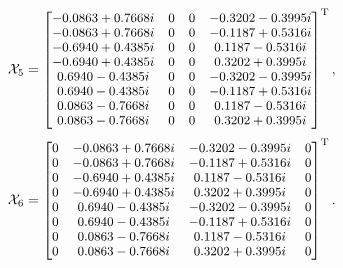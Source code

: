 \documentclass[journal]{IEEEtran}
\begin{document}
 \begin{equation}
  \footnotesize   
     \mathcal X_5=
\begin{bmatrix}
    -0.0863 + 0.7668i    &     0    &     0    &    -0.3202 - 0.3995i\\
  -0.0863 + 0.7668i    &     0    &     0    &    -0.1187 + 0.5316i\\
  -0.6940 + 0.4385i    &     0    &     0    &     0.1187 - 0.5316i\\
  -0.6940 + 0.4385i    &     0    &     0    &     0.3202 + 0.3995i\\
   0.6940 - 0.4385i    &     0    &     0    &    -0.3202 - 0.3995i\\
   0.6940 - 0.4385i    &     0    &     0    &    -0.1187 + 0.5316i\\
   0.0863 - 0.7668i    &     0    &     0    &     0.1187 - 0.5316i\\
   0.0863 - 0.7668i    &     0    &     0    &     0.3202 + 0.3995i\\
      \end{bmatrix}^{\text{T}}, \notag
  \end{equation}
\begin{equation}
  \footnotesize   
     \mathcal X_6=
\begin{bmatrix}
   0    &    -0.0863 + 0.7668i    &    -0.3202 - 0.3995i    &     0\\
   0    &    -0.0863 + 0.7668i    &    -0.1187 + 0.5316i    &     0\\
   0    &    -0.6940 + 0.4385i    &     0.1187 - 0.5316i    &     0\\
   0    &    -0.6940 + 0.4385i    &     0.3202 + 0.3995i    &     0\\
   0    &     0.6940 - 0.4385i    &    -0.3202 - 0.3995i    &     0\\
   0    &     0.6940 - 0.4385i    &    -0.1187 + 0.5316i    &     0\\
   0    &     0.0863 - 0.7668i    &     0.1187 - 0.5316i    &     0\\
   0    &     0.0863 - 0.7668i    &     0.3202 + 0.3995i    &     0\\
      \end{bmatrix}^{\text{T}}. \notag
  \end{equation}
    
    
  
% 
  
  
     
  
  
\end{document}
